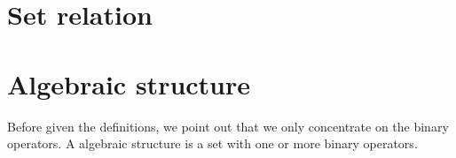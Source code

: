 \documentclass{amsbook}
\theoremstyle{definition}
\theoremstyle{remark}
\numberwithin{section}{chapter}
\numberwithin{equation}{chapter}
\begin{document}
\appendix
\chapter{Set relation}
\chapter{Algebraic structure}
Before given the definitions, we point out that we only concentrate on the binary operators. 
A algebraic structure is a set with one or more binary operators.




\backmatter


\printindex
\end{document}
